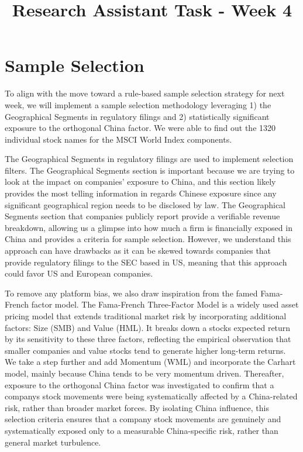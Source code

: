 \documentclass{article}
\title{Research Assistant Task - Week 4}
\begin{document}
\maketitle
\section{Sample Selection}\label{sample-selection}

To align with the move toward a rule-based sample selection strategy for
next week, we will implement a sample selection methodology leveraging
1) the Geographical Segments in regulatory filings and 2) statistically
significant exposure to the orthogonal China factor. We were able to
find out the 1320 individual stock names for the MSCI World Index
components.

The Geographical Segments in regulatory filings are used to implement
selection filters. The Geographical Segments section is important
because we are trying to look at the impact on companies' exposure to
China, and this section likely provides the most telling information in
regards Chinese exposure since any significant geographical region needs
to be disclosed by law. The Geographical Segments section that companies
publicly report provide a verifiable revenue breakdown, allowing us a
glimpse into how much a firm is financially exposed in China and
provides a criteria for sample selection. However, we understand this
approach can have drawbacks as it can be skewed towards companies that
provide regulatory filings to the SEC based in US, meaning that this
approach could favor US and European companies.

To remove any platform bias, we also draw inspiration from the famed
Fama-French factor model. The Fama-French Three-Factor Model is a widely
used asset pricing model that extends traditional market risk by
incorporating additional factors: Size (SMB) and Value (HML). It breaks
down a stock\textquotesingle s expected return by its sensitivity to
these three factors, reflecting the empirical observation that smaller
companies and value stocks tend to generate higher long-term returns. We
take a step further and add Momentum (WML) and incorporate the Carhart
model, mainly because China tends to be very momentum driven.
Thereafter, exposure to the orthogonal China factor was investigated to
confirm that a company\textquotesingle s stock movements were being
systematically affected by a China-related risk, rather than broader
market forces. By isolating China influence, this selection criteria
ensures that a company stock movements are genuinely and systematically
exposed only to a measurable China-specific risk, rather than general
market turbulence.
\end{document}

